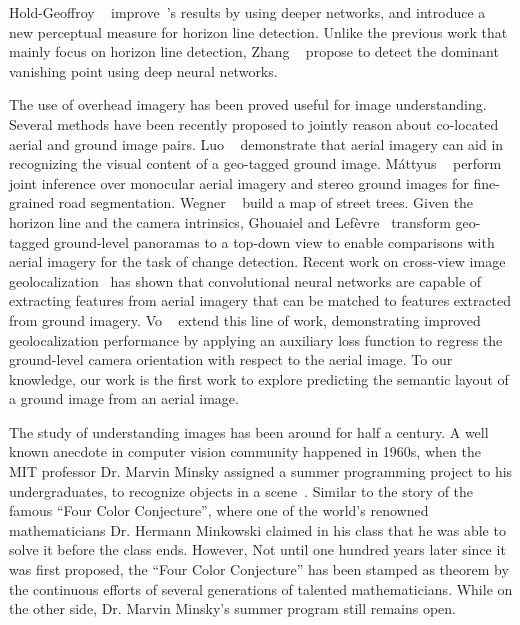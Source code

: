Hold-Geoffroy \etal~\cite{hold2017perceptual}
improve~\cite{workman2016horizon}'s results by using deeper networks,
and introduce a new perceptual measure for horizon line detection.
Unlike the previous work that mainly focus on horizon line detection,
Zhang \etal~\cite{zhang2018dominant} propose to detect the dominant
vanishing point using deep neural networks.


The use of overhead imagery has been proved useful for image
understanding.
Several methods have been recently proposed to jointly reason about
co-located aerial and ground image pairs. Luo
\etal~\cite{luo2008event} demonstrate that aerial imagery can aid
in recognizing the visual content of a geo-tagged ground image.
M{\'a}ttyus \etal~\cite{mattyus2016hd} perform joint inference over
monocular aerial imagery and stereo ground images for fine-grained
road segmentation. Wegner \etal~\cite{wegner2016cataloging} build a
map of street trees. Given the horizon line and the camera intrinsics,
Ghouaiel and Lef{\`e}vre~\cite{ghouaiel2016coupling} transform
geo-tagged ground-level panoramas to a top-down view to enable
comparisons with aerial imagery for the task of change detection.
Recent work on cross-view image
geolocalization~\cite{lin2013cross,lin2015learning,workman2015geocnn,workman2015wide}
 has shown that convolutional neural
networks are capable of extracting features from aerial imagery
that can be matched to features extracted from ground imagery.
Vo \etal~\cite{vo2016localizing} extend this line of work,
demonstrating improved geolocalization performance by applying an
auxiliary loss function to regress the ground-level camera orientation
with respect to the aerial image. To our knowledge, our work is the
first work to explore predicting the semantic layout of a ground
image from an aerial image.


The study of understanding images has been around for half a century.
A well known anecdote in computer vision community happened in 1960s,
when the MIT professor Dr. Marvin Minsky assigned a summer programming
project to his undergraduates, to recognize objects in a
scene~\cite{boden2006mind}. 
%
Similar to the story of the famous ``Four Color Conjecture'', where
one of the world's renowned mathematicians Dr. Hermann Minkowski
claimed in his class that he was able to solve it before the class
ends.  
However, Not until one hundred years later since it was first
proposed, the ``Four Color Conjecture'' has been stamped as theorem by
the continuous efforts of several generations of talented
mathematicians.  While on the other side, Dr. Marvin Minsky's summer
program still remains open.


